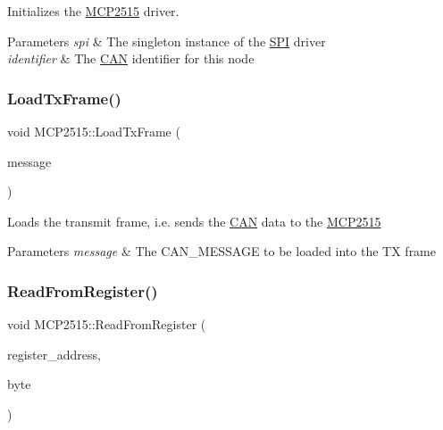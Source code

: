 Initializes the \hyperlink{class_m_c_p2515}{M\+C\+P2515} driver. 
\begin{DoxyParams}{Parameters}
{\em spi} & The singleton instance of the \hyperlink{namespace_s_p_i}{S\+PI} driver \\
\hline
{\em identifier} & The \hyperlink{class_c_a_n}{C\+AN} identifier for this node \\
\hline
\end{DoxyParams}
\hypertarget{class_m_c_p2515_a98ab4323b49fc629871584ce8f22a617}{}\label{class_m_c_p2515_a98ab4323b49fc629871584ce8f22a617} 
\subsubsection{\texorpdfstring{Load\+Tx\+Frame()}{LoadTxFrame()}}
{\footnotesize\ttfamily void M\+C\+P2515\+::\+Load\+Tx\+Frame (\begin{DoxyParamCaption}\item[{\hyperlink{struct_can_message}{Can\+Message} \&}]{message }\end{DoxyParamCaption})\hspace{0.3cm}{\ttfamily [private]}}

Loads the transmit frame, i.\+e. sends the \hyperlink{class_c_a_n}{C\+AN} data to the \hyperlink{class_m_c_p2515}{M\+C\+P2515} 
\begin{DoxyParams}{Parameters}
{\em message} & The C\+A\+N\+\_\+\+M\+E\+S\+S\+A\+GE to be loaded into the TX frame \\
\hline
\end{DoxyParams}
\hypertarget{class_m_c_p2515_a09ef6973daccbf868d89986e727cfa1b}{}\label{class_m_c_p2515_a09ef6973daccbf868d89986e727cfa1b} 
\subsubsection{\texorpdfstring{Read\+From\+Register()}{ReadFromRegister()}}
{\footnotesize\ttfamily void M\+C\+P2515\+::\+Read\+From\+Register (\begin{DoxyParamCaption}\item[{uint8\+\_\+t}]{register\+\_\+address,  }\item[{uint8\+\_\+t \&}]{byte }\end{DoxyParamCaption})\hspace{0.3cm}{\ttfamily [private]}}

